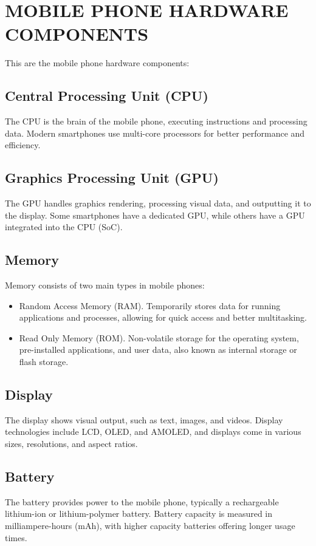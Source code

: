 \documentclass[conference]{IEEEtran}
\begin{document}
\section{MOBILE PHONE HARDWARE COMPONENTS}
This are the mobile phone hardware components:

\subsection{Central Processing Unit (CPU)}
The CPU is the brain of the mobile phone, executing
instructions and processing data. Modern smartphones use
multi-core processors for better performance and efficiency.

\subsection{Graphics Processing Unit (GPU)}
The GPU handles graphics rendering, processing visual
data, and outputting it to the display. Some smartphones have
a dedicated GPU, while others have a GPU integrated into the
CPU (SoC).

\subsection{Memory}
Memory consists of two main types in mobile phones:
\begin{itemize}
\item Random Access Memory (RAM). Temporarily stores data
for running applications and processes, allowing for quick
access and better multitasking.
\item Read Only Memory (ROM). Non-volatile storage for
the operating system, pre-installed applications, and user
data, also known as internal storage or flash storage.
\end{itemize}

\subsection{Display}
The display shows visual output, such as text, images,
and videos. Display technologies include LCD, OLED, and
AMOLED, and displays come in various sizes, resolutions,
and aspect ratios.

\subsection{Battery}
The battery provides power to the mobile phone, typically
a rechargeable lithium-ion or lithium-polymer battery. Battery
capacity is measured in milliampere-hours (mAh), with higher
capacity batteries offering longer usage times.
\end{document}
